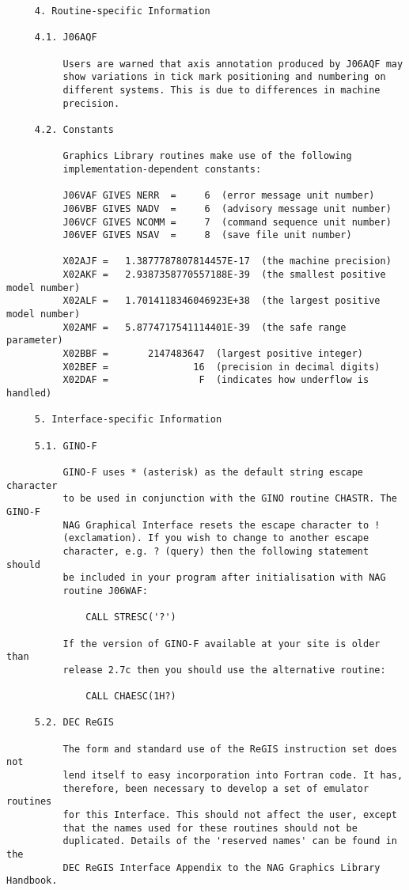 \begin{verbatim}
     4. Routine-specific Information
     
     4.1. J06AQF
     
          Users are warned that axis annotation produced by J06AQF may
          show variations in tick mark positioning and numbering on
          different systems. This is due to differences in machine
          precision.
     
     4.2. Constants
     
          Graphics Library routines make use of the following
          implementation-dependent constants:
     
          J06VAF GIVES NERR  =     6  (error message unit number)
          J06VBF GIVES NADV  =     6  (advisory message unit number)
          J06VCF GIVES NCOMM =     7  (command sequence unit number)
          J06VEF GIVES NSAV  =     8  (save file unit number)

          X02AJF =   1.3877787807814457E-17  (the machine precision)
          X02AKF =   2.9387358770557188E-39  (the smallest positive model number)
          X02ALF =   1.7014118346046923E+38  (the largest positive model number)
          X02AMF =   5.8774717541114401E-39  (the safe range parameter)
          X02BBF =       2147483647  (largest positive integer)
          X02BEF =               16  (precision in decimal digits)
          X02DAF =                F  (indicates how underflow is handled)
     
     5. Interface-specific Information

     5.1. GINO-F
     
          GINO-F uses * (asterisk) as the default string escape character
          to be used in conjunction with the GINO routine CHASTR. The GINO-F
          NAG Graphical Interface resets the escape character to !
          (exclamation). If you wish to change to another escape
          character, e.g. ? (query) then the following statement should
          be included in your program after initialisation with NAG
          routine J06WAF:

              CALL STRESC('?')
     
          If the version of GINO-F available at your site is older than
          release 2.7c then you should use the alternative routine:
     
              CALL CHAESC(1H?)
     
     5.2. DEC ReGIS
     
          The form and standard use of the ReGIS instruction set does not
          lend itself to easy incorporation into Fortran code. It has,
          therefore, been necessary to develop a set of emulator routines
          for this Interface. This should not affect the user, except
          that the names used for these routines should not be
          duplicated. Details of the 'reserved names' can be found in the
          DEC ReGIS Interface Appendix to the NAG Graphics Library Handbook.
     

\end{verbatim}
